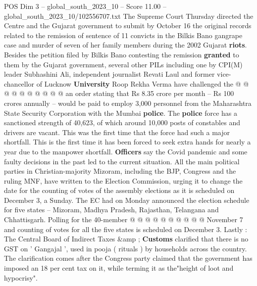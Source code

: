 \begin{textsample}{POS Dim 3 – global\_south\_2023\_10 – Score 11.00 – global\_south\_2023\_10/102556707.txt}
The Supreme Court Thursday directed the Centre and the Gujarat government to submit by October 16 the original records related to the remission of sentence of 11 convicts in the Bilkis Bano gangrape case and murder of seven of her family members during the 2002 Gujarat \textbf{riots}.
Besides the petition filed by Bilkis Bano contesting the remission \textbf{granted} to them by the Gujarat government, several other PILs including one by CPI(M) leader Subhashini Ali, independent journalist Revati Laul and former vice-chancellor of Lucknow \textbf{University} Roop Rekha Verma have challenged the @ @ @ @ @ @ @ @ @ @ an order stating that Rs 8.35 crore per month -- Rs 100 crores annually -- would be paid to employ 3,000 personnel from the Maharashtra State Security Corporation with the Mumbai \textbf{police}.
The \textbf{police} force has a sanctioned strength of 40,623, of which around 10,000 posts of constables and drivers are vacant.
This was the first time that the force had such a major shortfall.
This is the first time it has been forced to seek extra hands for nearly a year due to the manpower shortfall. \textbf{Officers} say the Covid pandemic and some faulty decisions in the past led to the current situation.
All the main political parties in Christian-majority Mizoram, including the BJP, Congress and the ruling MNF, have written to the Election Commission, urging it to change the date for the counting of votes of the assembly elections as it is scheduled on December 3, a Sunday.
The EC had on Monday announced the election schedule for five states -- Mizoram, Madhya Pradesh, Rajasthan, Telangana and Chhattisgarh.
Polling for the 40-member @ @ @ @ @ @ @ @ @ @ November 7 and counting of votes for all the five states is scheduled on December 3.
Lastly : The Central Board of Indirect Taxes \&amp ; \textbf{Customs} clarified that there is no GST on ' Gangajal ', used in pooja ( rituals ) by households across the country.
The clarification comes after the Congress party claimed that the government has imposed an 18 per cent tax on it, while terming it as the"height of loot and hypocrisy".

\end{textsample}
